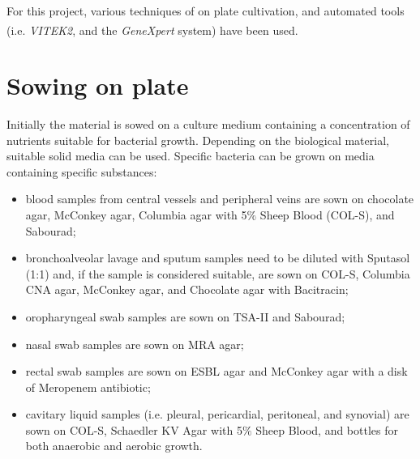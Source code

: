 \documentclass[11pt]{report}
\begin{document}
For this project, various techniques of on plate cultivation, and automated tools (i.e. \emph{VITEK}\textsuperscript{\textregistered}\emph{2}, and the \emph{GeneXpert} system) have been used.

\section{Sowing on plate}
Initially the material is sowed on a culture medium containing a concentration of nutrients suitable for bacterial growth.
Depending on the biological material, suitable solid media can be used.
Specific bacteria can be grown on media containing specific substances:
\begin{itemize}
\item blood samples from central vessels and peripheral veins are sown on chocolate agar, McConkey agar, Columbia agar with 5$\%$ Sheep Blood (COL-S), and Sabourad;
\item bronchoalveolar lavage and sputum samples need to be diluted with Sputasol (1:1) and, if the sample is considered suitable, are sown on COL-S, Columbia CNA agar, McConkey agar, and Chocolate agar with Bacitracin;
\item oropharyngeal swab samples are sown on TSA-II and Sabourad;
\item nasal swab samples are sown on MRA agar;
\item rectal swab samples are sown on ESBL agar and McConkey agar with a disk of Meropenem antibiotic;
\item cavitary liquid samples (i.e. pleural, pericardial, peritoneal, and synovial) are sown on COL-S, Schaedler KV Agar with 5$\%$ Sheep Blood, and bottles for both anaerobic and aerobic growth.
\end{itemize}
\end{document}
